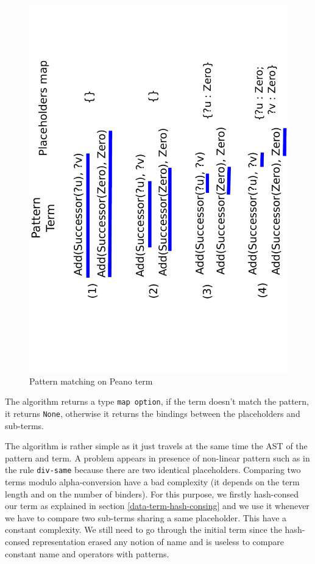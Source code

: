 \documentclass[12pt,a4paper]{article}
\begin{document}
\begin{figure}
  \centering
  \includegraphics[scale=0.6, angle=270]{example-peano.pdf}
  \caption{Pattern matching on Peano term}
  \label{peano-example}
\end{figure}

The algorithm returns a type \texttt{map option}, if the term doesn't match the pattern, it returns \texttt{None}, otherwise it returns the bindings between the placeholders and sub-terms.
\newline

The algorithm is rather simple as it just travels at the same time the AST of the pattern and term. A problem appears in presence of non-linear pattern such as in the rule \texttt{div-same} because there are two identical placeholders. Comparing two terms modulo alpha-conversion have a bad complexity (it depends on the term length and on the number of binders). For this purpose, we firstly hash-consed our term as explained in section \ref{data-term-hash-consing} and we use it whenever we have to compare two sub-terms sharing a same placeholder. This have a constant complexity. We still need to go through the initial term since the hash-consed representation erased any notion of name and is useless to compare constant name and operators with patterns.
\end{document}
